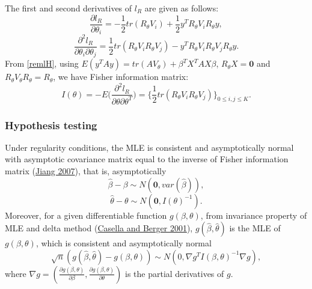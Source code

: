\documentclass[
]{article}
\begin{document}
The first and second derivatives of \(l_R\) are given as follows:
\begin{equation}\label{remlS}
\frac{\partial l_R}{\partial\theta_i}
= -\frac{1}{2}tr(R_{\theta}V_i) + \frac{1}{2}y^TR_{\theta}V_iR_{\theta}y,
\end{equation} \begin{equation}\label{remlH}
\frac{\partial^2l_R}{\partial\theta_i\partial\theta_j}
= \frac{1}{2}tr(R_{\theta}V_iR_{\theta}V_j) - y^TR_{\theta}V_iR_{\theta}V_jR_{\theta}y.
\end{equation} From \eqref{remlH}, using
\(E(y^TAy) = tr(AV_{\theta}) + \beta^TX^TAX\beta\),
\(R_{\theta}X = \mathbf{0}\) and
\(R_{\theta}V_{\theta}R_{\theta} = R_{\theta}\), we have Fisher
information matrix: \begin{equation}\label{remlI}
I(\theta) = -E\Big(\frac{\partial^2l_R}{\partial\theta\partial\theta^T}\Big) 
= \big\{\frac{1}{2}tr(R_{\theta}V_iR_{\theta}V_j) \big\}_{0\leq i,j\leq K}.
\end{equation}

\hypertarget{hypothesis-testing}{%
\subsubsection{Hypothesis testing}\label{hypothesis-testing}}

Under regularity conditions, the MLE is consistent and asymptotically
normal with asymptotic covariance matrix equal to the inverse of Fisher
information matrix (\protect\hyperlink{ref-Jiang2007}{Jiang 2007}), that
is, asymptotically \begin{equation}\label{betaDist}
\hat\beta - \beta \sim N(\mathbf{0}, var(\hat\beta)),
\end{equation} \begin{equation}\label{thetaDist}
\hat\theta - \theta \sim N(\mathbf{0}, I(\theta)^{-1}).
\end{equation} Moreover, for a given differentiable function
\(g(\beta, \theta)\), from invariance property of MLE and delta method
(\protect\hyperlink{ref-Casella2001}{Casella and Berger 2001}),
\(g(\hat\beta, \hat\theta)\) is the MLE of \(g(\beta,\theta)\), which is
consistent and asymptotically normal \begin{equation}\label{mleInv}
\sqrt{n}(g(\hat\beta, \hat\theta) - g(\beta,\theta)) \sim N(0, \nabla g^TI(\beta, \theta)^{-1}\nabla g),
\end{equation} where
\(\nabla g = (\frac{\partial g(\beta,\theta)}{\partial\beta}, \frac{\partial g(\beta,\theta)}{\partial\theta})\)
is the partial derivatives of \(g\).
\end{document}
